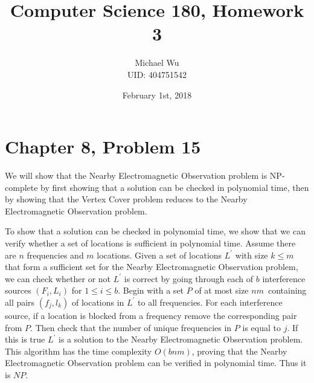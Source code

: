 \documentclass[12pt]{article}
\begin{document}
\title{Computer Science 180, Homework 3}
\date{February 1st, 2018}
\author{Michael Wu\\UID: 404751542}
\maketitle

\section*{Chapter 8, Problem 15}

We will show that the Nearby Electromagnetic Observation problem is NP-complete by first showing
that a solution can be checked in polynomial time, then by showing that the Vertex Cover problem reduces
to the Nearby Electromagnetic Observation problem.

To show that a solution can be checked in polynomial time, we show that we can verify whether a set of locations is
sufficient in polynomial time. Assume there are \(n\) frequencies and \(m\) locations.
Given a set of locations \(L^\prime\) with size \(k\leq m\) that form a sufficient set for the Nearby Electromagnetic Observation problem, we can
check whether or not \(L^\prime\) is correct by going through each of \(b\) interference sources \((F_i, L_i)\) for \(1\leq i\leq b\).
Begin with a set \(P\) of at most size \(nm\)\ containing all pairs \((f_j, l_k)\) of locations in \(L^\prime\) to all frequencies.
For each interference source, if a location is blocked from a frequency remove the corresponding pair from \(P\).
Then check that the number of unique frequencies in \(P\) is equal to \(j\). If this is true \(L^\prime\) is a solution
to the Nearby Electromagnetic Observation problem. This algorithm has the time complexity \(O(bnm)\), proving that the
Nearby Electromagnetic Observation problem can be verified in polynomial time. Thus it is \(NP\).
\end{document}
